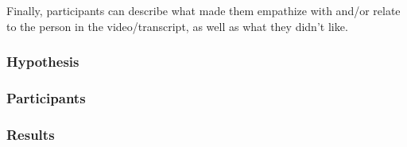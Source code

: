 Finally, participants can describe what made them empathize with and/or relate to the person in the video/transcript, as well as what they didn't like.

\subsubsection{Hypothesis}

\subsubsection{Participants}

\subsubsection{Results}
